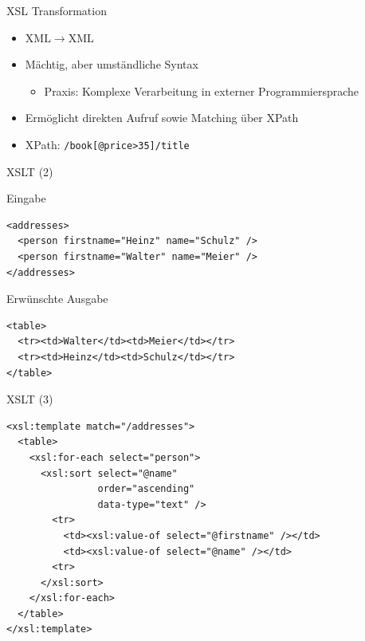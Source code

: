\documentclass{beamer}
\newcommand{\pfeil}{\item[$\Rightarrow$]}
\newcommand\ato{\rightarrow} %
\begin{document}
\begin{frame}[fragile]{XSL Transformation}
  \begin{itemize}
  \item $\mathrm{XML} \ato \mathrm{XML}$
  \item Mächtig, aber umständliche Syntax
    \begin{itemize}
    \pfeil Praxis: Komplexe Verarbeitung in externer
      Programmiersprache
    \end{itemize}
  \item Ermöglicht direkten Aufruf sowie Matching über XPath
  \item XPath: \verb+/book[@price>35]/title+
  \end{itemize}
\end{frame}

\begin{frame}[fragile]{XSLT (2)}

  \begin{block}{Eingabe}
\begin{verbatim}
<addresses>
  <person firstname="Heinz" name="Schulz" />
  <person firstname="Walter" name="Meier" />
</addresses>
\end{verbatim}
  \end{block}
  \begin{block}{Erwünschte Ausgabe}
\begin{verbatim}
<table>
  <tr><td>Walter</td><td>Meier</td></tr>
  <tr><td>Heinz</td><td>Schulz</td></tr>
</table>    
\end{verbatim}
\end{block}
\end{frame}

\begin{frame}[fragile]{XSLT (3)}
\begin{verbatim}
<xsl:template match="/addresses">
  <table>
    <xsl:for-each select="person">
      <xsl:sort select="@name" 
                order="ascending" 
                data-type="text" />
        <tr>
          <td><xsl:value-of select="@firstname" /></td>
          <td><xsl:value-of select="@name" /></td>
        <tr>
      </xsl:sort>
    </xsl:for-each>
  </table>
</xsl:template>
\end{verbatim}
\end{frame}
\end{document}
